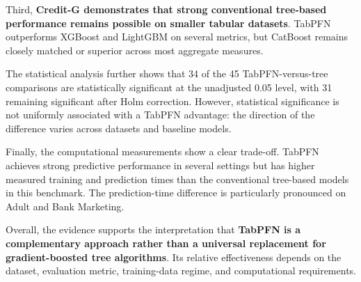 Third, \textbf{Credit-G demonstrates that strong conventional tree-based performance remains possible on smaller tabular datasets}. TabPFN outperforms XGBoost and LightGBM on several metrics, but CatBoost remains closely matched or superior across most aggregate measures.



The statistical analysis further shows that 34 of the 45 TabPFN-versus-tree comparisons are statistically significant at the unadjusted 0.05 level, with 31 remaining significant after Holm correction. However, statistical significance is not uniformly associated with a TabPFN advantage: the direction of the difference varies across datasets and baseline models.



Finally, the computational measurements show a clear trade-off. TabPFN achieves strong predictive performance in several settings but has higher measured training and prediction times than the conventional tree-based models in this benchmark. The prediction-time difference is particularly pronounced on Adult and Bank Marketing.



Overall, the evidence supports the interpretation that \textbf{TabPFN is a complementary approach rather than a universal replacement for gradient-boosted tree algorithms}. Its relative effectiveness depends on the dataset, evaluation metric, training-data regime, and computational requirements.
